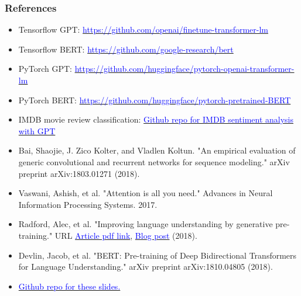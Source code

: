 \documentclass[9pt]{beamer}
\begin{document}
\begin{frame}
  \frametitle{References}

  \fontsize{6pt}{7.2}\selectfont

  \begin{itemize}
  \item Tensorflow GPT: \href{https://github.com/openai/finetune-transformer-lm}{\textcolor{blue}{https://github.com/openai/finetune-transformer-lm}}

  \item Tensorflow BERT: \href{https://github.com/google-research/bert}{\textcolor{blue}{https://github.com/google-research/bert}}

  \item PyTorch GPT: \href{https://github.com/huggingface/pytorch-openai-transformer-lm}{\textcolor{blue}{https://github.com/huggingface/pytorch-openai-transformer-lm}}

  \item PyTorch BERT: \href{https://github.com/huggingface/pytorch-pretrained-BERT}{\textcolor{blue}{https://github.com/huggingface/pytorch-pretrained-BERT}}

  \item IMDB movie review classification: \href{https://github.com/rodgzilla/pytorch-openai-transformer-lm/tree/movie_reviews_classification}{\textcolor{blue}{Github repo for IMDB sentiment analysis with GPT}}

  \item Bai, Shaojie, J. Zico Kolter, and Vladlen Koltun. "An
    empirical evaluation of generic convolutional and recurrent
    networks for sequence modeling." arXiv preprint arXiv:1803.01271
    (2018).

  \item Vaswani, Ashish, et al. "Attention is all you need." Advances
    in Neural Information Processing Systems. 2017.

  \item Radford, Alec, et al. "Improving language understanding by generative pre-training." URL
    \href{https://s3-us-west-2.amazonaws.com/openai-assets/research-covers/language-unsupervised/language_understanding_paper.pdf}{\textcolor{blue}{Article pdf link}},
    \href{https://blog.openai.com/language-unsupervised/}{\textcolor{blue}{Blog post}} (2018).

  \item Devlin, Jacob, et al. "BERT: Pre-training of Deep
    Bidirectional Transformers for Language Understanding." arXiv
    preprint arXiv:1810.04805 (2018).

    \bigskip

  \item \href{https://github.com/rodgzilla/talk-slides/tree/master/deep_learning/transformer_language_model}{\textcolor{blue}{Github repo for these slides.}}
  \end{itemize}
\end{frame}
\end{document}

